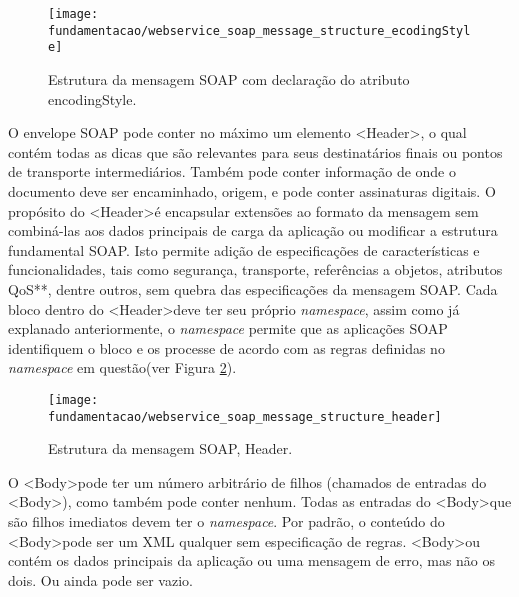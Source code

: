 \begin{figure}[!htb] \centering
  \centering
  \texttt{[image: fundamentacao/webservice\_soap\_message\_structure\_ecodingStyle]} 
  \caption{Estrutura da mensagem SOAP com declaração do atributo encodingStyle.\cite{Papazoglou:2008}} 
  \label{fig:wssoap_msg_ecodingStyle}
\end{figure}

O envelope SOAP pode conter no máximo um elemento \textless Header\textgreater, o qual contém todas as dicas que são relevantes para seus destinatários finais ou pontos de transporte intermediários. Também pode conter informação de onde o documento deve ser encaminhado, origem, e pode conter assinaturas digitais. O propósito do \textless Header\textgreater é encapsular extensões ao formato da mensagem sem combiná-las aos dados principais de carga da aplicação ou modificar a estrutura fundamental SOAP. Isto permite adição de especificações de características e funcionalidades, tais como segurança, transporte, referências a objetos, atributos QoS**, dentre outros, sem quebra das especificações da mensagem SOAP. Cada bloco dentro do \textless Header\textgreater deve ter seu próprio \textit{namespace}, assim como já explanado anteriormente, o \textit{namespace} permite que as aplicações SOAP identifiquem o bloco e os processe de acordo com as regras definidas no \textit{namespace} em questão(ver Figura \ref{fig:wssoap_msg_header}).\cite{Papazoglou:2008}

\begin{figure}[!htb] \centering
  \centering
  \texttt{[image: fundamentacao/webservice\_soap\_message\_structure\_header]} 
  \caption{Estrutura da mensagem SOAP, Header.\cite{Papazoglou:2008}} 
  \label{fig:wssoap_msg_header}
\end{figure}

O \textless Body\textgreater pode ter um número arbitrário de filhos (chamados de entradas do \textless Body\textgreater), como também pode conter nenhum. Todas as entradas do \textless Body\textgreater que são filhos imediatos devem ter o \textit{namespace}. Por padrão, o conteúdo do \textless Body\textgreater pode ser um XML qualquer sem especificação de regras. \textless Body\textgreater ou contém os dados principais da aplicação ou uma mensagem de erro, mas não os dois. Ou ainda pode ser vazio.\cite{Papazoglou:2008}

